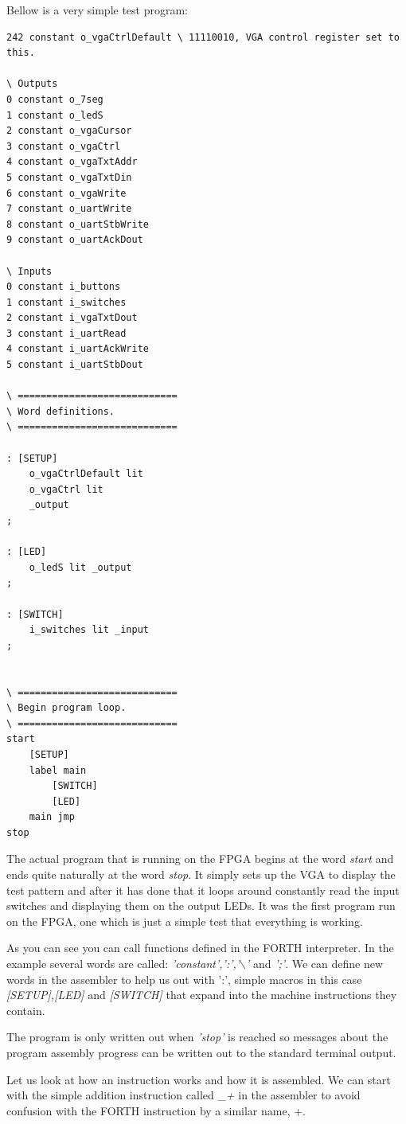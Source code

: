 \documentclass	[a4paper, 10pt]	{article}
\begin{document}
    Bellow is a very simple test program:

\begin{verbatim}
242 constant o_vgaCtrlDefault \ 11110010, VGA control register set to this.

\ Outputs
0 constant o_7seg
1 constant o_ledS
2 constant o_vgaCursor
3 constant o_vgaCtrl
4 constant o_vgaTxtAddr
5 constant o_vgaTxtDin
6 constant o_vgaWrite
7 constant o_uartWrite
8 constant o_uartStbWrite
9 constant o_uartAckDout

\ Inputs
0 constant i_buttons
1 constant i_switches
2 constant i_vgaTxtDout
3 constant i_uartRead
4 constant i_uartAckWrite
5 constant i_uartStbDout

\ ============================
\ Word definitions.
\ ============================

: [SETUP]
    o_vgaCtrlDefault lit
    o_vgaCtrl lit 
    _output
;

: [LED]
    o_ledS lit _output
;

: [SWITCH]
    i_switches lit _input
;


\ ============================
\ Begin program loop.
\ ============================
start
    [SETUP]
    label main
        [SWITCH]
        [LED]
    main jmp
stop
\end{verbatim}

    The actual program that is running on the FPGA begins at the word \emph{start}
    and ends quite naturally at the word \emph{stop}. It simply sets up the VGA
    to display the test pattern and after it has done that it loops around
    constantly read the input switches and displaying them on the output LEDs. It
    was the first program run on the FPGA, one which is just a simple test that
    everything is working.

    As you can see you can call functions defined in the FORTH interpreter. In the
    example several words are called: \emph{'constant',':','$\backslash$'} and \emph{';'}. We can
    define new words in the assembler to help us out with ':', simple macros in
    this case \emph{[SETUP],[LED]} and \emph{[SWITCH]} that expand into the machine
    instructions they contain.

    The program is only written out when \emph{'stop'} is reached so messages
    about the program assembly progress can be written out to the standard terminal
    output.

    Let us look at how an instruction works and how it is assembled. We can start
    with the simple addition instruction called \emph{\_+} in the assembler to
    avoid confusion with the FORTH instruction by a similar name, +. 
\end{document}
